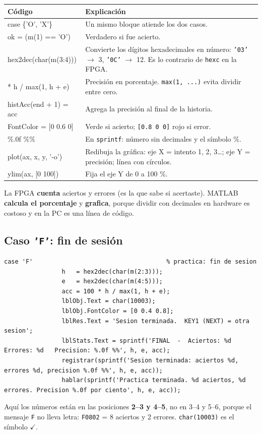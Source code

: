 \documentclass[11pt,a4paper]{article}
\newcommand{\cod}[1]{\texttt{#1}}
\begin{document}
\begin{longtable}{>{\ttfamily}p{4.4cm} p{9.7cm}}
\toprule
\normalfont\textbf{Código} & \textbf{Explicación} \\
\midrule
\endhead
case \{'O', 'X'\} & Un mismo bloque atiende los dos casos. \\
ok = (m(1) == 'O') & Verdadero si fue acierto. \\
hex2dec(char(m(3:4))) & Convierte los dígitos hexadecimales en número: \cod{'03'} $\rightarrow$ 3, \cod{'0C'} $\rightarrow$ 12. Es lo contrario de \cod{hexc} en la FPGA. \\
100 * h / max(1, h + e) & Precisión en porcentaje. \cod{max(1, ...)} evita dividir entre cero. \\
histAcc(end + 1) = acc & Agrega la precisión al final de la historia. \\
FontColor = [0 0.6 0] & Verde si acierto; \cod{[0.8 0 0]} rojo si error. \\
\%.0f \%\% & En \cod{sprintf}: número sin decimales y el símbolo \%. \\
plot(ax, x, y, '-o') & Redibuja la gráfica: eje X = intento 1, 2, 3\ldots; eje Y = precisión; línea con círculos. \\
ylim(ax, [0 100]) & Fija el eje Y de 0 a 100 \%. \\
\bottomrule
\end{longtable}

\begin{idea}
La FPGA \textbf{cuenta} aciertos y errores (es la que sabe si acertaste). MATLAB
\textbf{calcula el porcentaje} y \textbf{grafica}, porque dividir con decimales en
hardware es costoso y en la PC es una línea de código.
\end{idea}

\subsection{Caso \texttt{'F'}: fin de sesión}
\begin{lstlisting}[firstnumber=251]
            case 'F'                                     % practica: fin de sesion
                h   = hex2dec(char(m(2:3)));
                e   = hex2dec(char(m(4:5)));
                acc = 100 * h / max(1, h + e);
                lblObj.Text = char(10003);
                lblObj.FontColor = [0 0.4 0.8];
                lblRes.Text = 'Sesion terminada.  KEY1 (NEXT) = otra sesion';
                lblStats.Text = sprintf('FINAL  -  Aciertos: %d   Errores: %d   Precision: %.0f %%', h, e, acc);
                registrar(sprintf('Sesion terminada: aciertos %d, errores %d, precision %.0f %%', h, e, acc));
                hablar(sprintf('Practica terminada. %d aciertos, %d errores. Precision %.0f por ciento', h, e, acc));
\end{lstlisting}
\begin{ojo}
Aquí los números están en las posiciones \textbf{2--3 y 4--5}, no en 3--4 y 5--6,
porque el mensaje \cod{F} no lleva letra: \cod{F0802} = 8 aciertos y 2 errores.
\cod{char(10003)} es el símbolo $\checkmark$.
\end{ojo}
\end{document}
